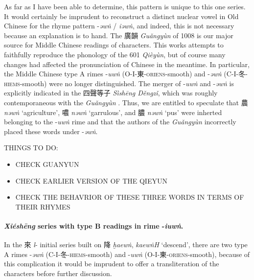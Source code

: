 As far as I have been able to determine, this pattern is unique to this one series. It would certainly be imprudent to reconstruct a distinct nuclear vowel in Old Chinese for the rhyme pattern -\textit{əwṅ} / \textit{iəwṅ}, and indeed, this is not necessary because an explanation is to hand.
The 廣韻 \textit{Guǎngyùn} of 1008 is our major source for Middle Chinese readings of characters. This works attempts to faithfully reproduce the phonology of the 601 \textit{Qièyùn}, but of course many changes had affected the pronunciation of Chinese in the meantime. In particular, the Middle Chinese type A rimes 
-\textit{uwṅ} (O-I-東-\textsc{oriens}-smooth) and -\textit{əwṅ}  (C-I-冬-\textsc{hiems}-smooth) were no longer distinguished. The merger of -\textit{uwṅ} and  -\textit{əwṅ} is explicitly indicated in the 四聲等子 \textit{Sìshēng Děngzǐ}, which was roughly contemporaneous with the \textit{Guǎngyùn}  
\citep[pp. 183 and 185]{shen2020phonological}. 
Thus, we are entitled to speculate that 
農 \textit{nəwṅ} `agriculture',
噥 \textit{nəwṅ} `garrulous', and 
膿 \textit{nəwṅ} `pus' were inherted belonging to the -\textit{uwṅ} rime and that the authors of the \textit{Guǎngyùn} incorrectly placed these words under -\textit{əwṅ}. 

THINGS TO DO: 

\begin{itemize}
    \item CHECK GUANYUN
    \item CHECK EARLIER VERSION OF THE QIEYUN
    \item CHECK THE BEHAVRIOR OF THESE THREE WORDS IN TERMS OF THEIR RHYMES
\end{itemize}

\paragraph{\textit{Xiéshēng} series with type B readings in rime -\textit{iuwṅ}.}
\label{par:əwṅ-iuwṅ-XS-pair}
%
%
In the 來 \textit{l}- initial series built on 降 \textit{ḫaewṅ}, \textit{kaewṅH} `descend', there are two type A rimes -\textit{əwṅ} (C-I-冬-\textsc{hiems}-smooth)
and -\textit{uwṅ} (O-I-東-\textsc{oriens}-smooth), because of this complication it would be imprudent to offer a transliteration of the characters before further discussion. 

